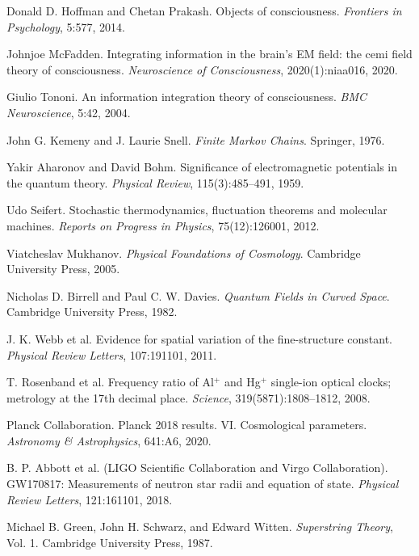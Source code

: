 \documentclass[12pt,a4paper]{article}
\theoremstyle{definition}
\begin{document}
\begin{thebibliography}{99}

Donald D. Hoffman and Chetan Prakash.
Objects of consciousness.
\emph{Frontiers in Psychology}, 5:577, 2014.

Johnjoe McFadden.
Integrating information in the brain's EM field: the cemi field theory of consciousness.
\emph{Neuroscience of Consciousness}, 2020(1):niaa016, 2020.

Giulio Tononi.
An information integration theory of consciousness.
\emph{BMC Neuroscience}, 5:42, 2004.

John G. Kemeny and J. Laurie Snell.
\emph{Finite Markov Chains}.
Springer, 1976.

Yakir Aharonov and David Bohm.
Significance of electromagnetic potentials in the quantum theory.
\emph{Physical Review}, 115(3):485--491, 1959.

Udo Seifert.
Stochastic thermodynamics, fluctuation theorems and molecular machines.
\emph{Reports on Progress in Physics}, 75(12):126001, 2012.

Viatcheslav Mukhanov.
\emph{Physical Foundations of Cosmology}.
Cambridge University Press, 2005.

Nicholas D. Birrell and Paul C. W. Davies.
\emph{Quantum Fields in Curved Space}.
Cambridge University Press, 1982.

J. K. Webb et al.
Evidence for spatial variation of the fine-structure constant.
\emph{Physical Review Letters}, 107:191101, 2011.

T. Rosenband et al.
Frequency ratio of Al$^+$ and Hg$^+$ single-ion optical clocks; metrology at the 17th decimal place.
\emph{Science}, 319(5871):1808--1812, 2008.

Planck Collaboration.
Planck 2018 results. VI. Cosmological parameters.
\emph{Astronomy \& Astrophysics}, 641:A6, 2020.

B. P. Abbott et al. (LIGO Scientific Collaboration and Virgo Collaboration).
GW170817: Measurements of neutron star radii and equation of state.
\emph{Physical Review Letters}, 121:161101, 2018.

Michael B. Green, John H. Schwarz, and Edward Witten.
\emph{Superstring Theory}, Vol. 1.
Cambridge University Press, 1987.


\end{thebibliography}
\end{document}
